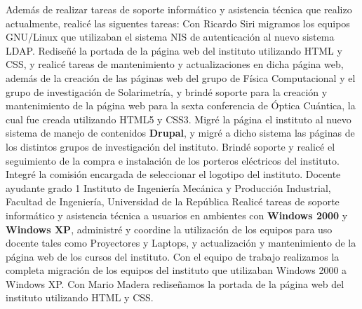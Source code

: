 \documentclass[11pt,a4paper]{moderncv}
\begin{document}
        {Además de realizar tareas de soporte informático y asistencia técnica que realizo actualmente, realicé las siguentes tareas:
         \newline{}
         Con Ricardo Siri migramos los equipos GNU/Linux que utilizaban el sistema NIS de autenticación al nuevo sistema LDAP.
         \newline{}
         Rediseñé la portada de la página web del instituto utilizando HTML y CSS, y realicé tareas de mantenimiento y actualizaciones en dicha página web, además de la creación de las páginas web del grupo de Física Computacional y el grupo de investigación de Solarimetría, y brindé soporte para la creación y mantenimiento de la página web para la sexta conferencia de Óptica Cuántica, la cual fue creada utilizando HTML5 y CSS3.
         \newline{}
         Migré la página el instituto al nuevo sistema de manejo de contenidos \textbf{Drupal}, y migré a dicho sistema las páginas de los distintos grupos de investigación del instituto.
         \newline{}
         Brindé soporte y realicé el seguimiento de la compra e instalación de los porteros eléctricos del instituto.
         \newline{}
         Integré la comisión encargada de seleccionar el logotipo del instituto.
         }
\cvline{}{}
        {Docente ayudante grado 1}{}
        {Instituto de Ingeniería Mecánica y Producción Industrial, Facultad de Ingeniería, Universidad de la República}{}
        {Realicé tareas de soporte informático y asistencia técnica a usuarios en ambientes con \textbf{Windows 2000} y \textbf{Windows XP}, administré y coordine la utilización de los equipos para uso docente tales como Proyectores y Laptops, y actualización y mantenimiento de la página web de los cursos del instituto.
         \newline{}
         Con el equipo de trabajo realizamos la completa migración de los equipos del instituto que utilizaban Windows 2000 a Windows XP.
         \newline{}
         Con Mario Madera rediseñamos la portada de la página web del instituto utilizando HTML y CSS.
        }

\end{document}
